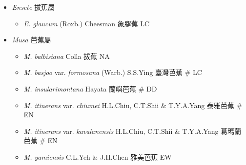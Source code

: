 
  \begin{itemize}
 \item[] \textit{Ensete} 拔蕉屬
                                
  \begin{itemize}
        \item[] \textit{E. glaucum} (Roxb.) Cheesman  象腿蕉   LC
  \end{itemize}
 \item[] \textit{Musa} 芭蕉屬
                                
  \begin{itemize}
        \item[] \textit{M. balbisiana} Colla  拔蕉   NA
        \item[] \textit{M. basjoo} var. \textit{formosana} (Warb.) S.S.Ying  臺灣芭蕉  \# LC
        \item[] \textit{M. insularimontana} Hayata  蘭嶼芭蕉  \# DD
        \item[] \textit{M. itinerans} var. \textit{chiumei} H.L.Chiu, C.T.Shii \& T.Y.A.Yang  泰雅芭蕉  \# EN
        \item[] \textit{M. itinerans} var. \textit{kavalanensis} H.L.Chiu, C.T.Shii \& T.Y.A.Yang  葛瑪蘭芭蕉  \# EN
        \item[] \textit{M. yamiensis} C.L.Yeh \& J.H.Chen  雅美芭蕉   EW
  \end{itemize}
  \end{itemize}
